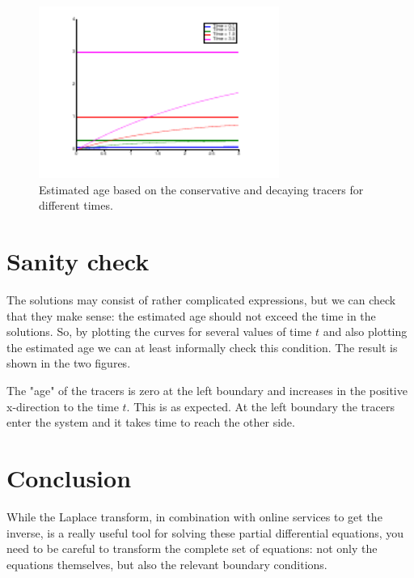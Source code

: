 \documentclass[onecolumn]{article}
\begin{document}
\begin{figure}[H]
\caption{Estimated age based on the conservative and decaying tracers for different times.}
\label{estimated_age}
\begin{center}
\includegraphics[width=0.7\textwidth]{estimated_age.pdf}
\end{center}
\end{figure}




\section*{Sanity check}
The solutions may consist of rather complicated expressions, but we can check that they make sense: the estimated age should not
exceed the time in the solutions. So, by plotting the curves for several values of time $t$ and also plotting the estimated age
we can at least informally check this condition. The result is shown in the two figures.

The "age" of the tracers is zero at the left boundary and increases in the positive x-direction to the time $t$. This is as expected.
At the left boundary the tracers enter the system and it takes time to reach the other side.


\section*{Conclusion}
While the Laplace transform, in combination with online services to get the inverse, is a really useful tool for solving these partial
differential equations, you need to be careful to transform the complete set of equations: not only the equations themselves, but
also the relevant boundary conditions.


\end{document}
